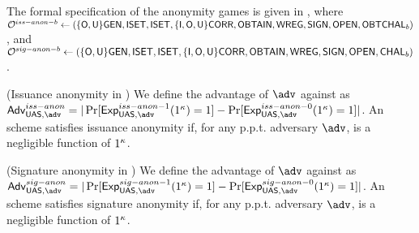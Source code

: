 The formal specification of the anonymity games is given in
, where
$\mathcal{O}^{iss-anon-b} \gets (\lbrace\mathsf{O},\mathsf{U}\rbrace\mathsf{GEN},\mathsf{ISET},\mathsf{ISET},\lbrace\mathsf{I},
\mathsf{O},\mathsf{U}\rbrace\mathsf{CORR},\mathsf{OBTAIN},\mathsf{WREG},\mathsf{SIGN},\mathsf{OPEN},\mathsf{OBTCHAL}_b)$, and $\mathcal{O}^{sig-anon-b}
\gets (\lbrace\mathsf{O},\mathsf{U}\rbrace\mathsf{GEN},\mathsf{ISET},\mathsf{ISET},\lbrace\mathsf{I},\mathsf{O},\mathsf{U}\rbrace
\mathsf{CORR},\mathsf{OBTAIN},\mathsf{WREG},\mathsf{SIGN},\mathsf{OPEN},\mathsf{CHAL}_b)$.

\begin{figure*}[htp!]
  \centering
  \caption{Issuance and signature anonymity experiments for \UAS schemes.}
  \label{fig:exp-uas-anonb}
\end{figure*}

\begin{definition}{(Issuance anonymity in \UAS)}
  \label{def:issue-anonymity-uas}  
  We define the advantage \AdvIssAnon of $\adv$ against \ExpIssAnonb as
  $\AdvIssAnon=|\Pr\lbrack\ExpIssAnono(1^\secpar)=1\rbrack-
  \Pr\lbrack\ExpIssAnonz(1^\secpar)=1\rbrack|$.
  An \UAS scheme satisfies issuance anonymity if, for any p.p.t. adversary
  $\adv$, \AdvIssAnon is a negligible function of $1^\kappa$.
\end{definition}

\begin{definition}{(Signature anonymity in \UAS)}
  \label{def:sign-anonymity-uas}  
  We define the advantage \AdvSigAnon of $\adv$ against \ExpSigAnonb as
  $\AdvSigAnon=|\Pr\lbrack\ExpSigAnono(1^\secpar)=1\rbrack-
  \Pr\lbrack\ExpSigAnonz(1^\secpar)=1\rbrack|$.
  An \UAS scheme satisfies signature anonymity if, for any p.p.t. adversary
  $\adv$, \AdvSigAnon is a negligible function of $1^\kappa$.
\end{definition}

